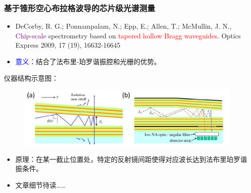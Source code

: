 \begin{frame}[c]
    \frametitle{基于锥形空心布拉格波导的芯片级光谱测量}
    \begin{itemize}
        \item DeCorby, R. G.;  Ponnampalam, N.;  Epp, E.;  Allen, T.; McMullin, J. N., \textcolor{purple}{Chip-scale} spectrometry based on \textcolor{red}{tapered hollow Bragg waveguides}. Optics Express 2009, 17 (19), 16632-16645
        \item \textcolor{blue}{意义：}结合了法布里-珀罗谐振腔和光栅的优势。
    \end{itemize}
    仪器结构示意图：
    \begin{figure}[H] %
        \centering %
        \includegraphics[width=1.\textwidth]{figures/Chip-scale spectrometry based on tapered hollow Bragg waveguides_1.png} %
    \end{figure}
    \begin{itemize}
        \item 原理：在某一截止位置处，特定的反射镜间距使得对应波长达到法布里珀罗谐振条件。
        \item 文章细节待读……
    \end{itemize}
\end{frame}